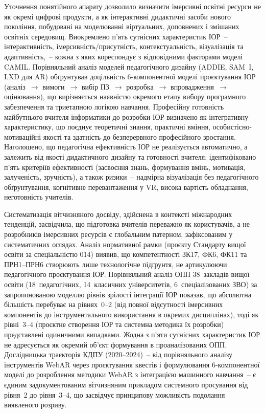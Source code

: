 Уточнення понятійного апарату дозволило визначити імерсивні освітні ресурси не як окремі цифрові продукти, а як інтерактивні дидактичні засоби нового покоління, побудовані на моделюванні віртуальних, доповнених і змішаних освітніх середовищ. Виокремлено п'ять сутнісних характеристик ІОР~-- інтерактивність, імерсивність/присутність, контекстуальність, візуалізація та адаптивність,~-- кожна з яких кореспондує з відповідними факторами моделі CAMIL. Порівняльний аналіз моделей педагогічного дизайну (ADDIE, SAM~I, LXD для AR) обґрунтував доцільність 6-компонентної моделі проєктування ІОР (аналіз~$\to$ вимоги~$\to$ вибір ПЗ~$\to$ розробка~$\to$ впровадження~$\to$ оцінювання), що вирізняється наявністю окремого етапу вибору програмного забезпечення та триетапною логікою навчання. Професійну готовність майбутнього вчителя інформатики до розробки ІОР визначено як інтегративну характеристику, що поєднує теоретичні знання, практичні вміння, особистісно-мотиваційні якості та здатність до безперервного професійного зростання. Наголошено, що педагогічна ефективність ІОР не реалізується автоматично, а залежить від якості дидактичного дизайну та готовності вчителя; ідентифіковано п'ять критеріїв ефективності (засвоєння знань, формування вмінь, мотивація, залученість, зручність), а також ризики~-- надмірна візуалізація без педагогічного обґрунтування, когнітивне перевантаження у VR, висока вартість обладнання, неготовність учителів.

Систематизація вітчизняного досвіду, здійснена в контексті міжнародних тенденцій, засвідчила, що підготовка вчителів переважно як користувачів, а не розробників імерсивних ресурсів є глобальним патерном, зафіксованим у систематичних оглядах. Аналіз нормативної рамки (проєкту Стандарту вищої освіти за спеціальністю 014) виявив, що компетентності ЗК17, ФК6, ФК11 та ПРН1--ПРН6 створюють лише технологічне підґрунтя, не артикулюючи педагогічного проєктування ІОР. Порівняльний аналіз ОПП 38~закладів вищої освіти (18~педагогічних, 14~класичних університетів, 6~спеціалізованих ЗВО) за запропонованою моделлю рівнів зрілості інтеграції ІОР показав, що абсолютна більшість перебуває на рівнях~0--2 (від повної відсутності імерсивних компонентів до інструментального використання в окремих дисциплінах), тоді як рівні~3--4 (проєктне створення ІОР та системна методика їх розробки) представлені одиничними випадками. Жодна з п'яти сутнісних характеристик ІОР не адресується як окремий об'єкт формування в проаналізованих ОПП. Дослідницька траєкторія КДПУ (2020--2024)~-- від порівняльного аналізу інструментів WebAR через проєктування квестів і формулювання 6-компонентної моделі до розроблення методики WebAR з інтеграцією машинного навчання~-- є єдиним задокументованим вітчизняним прикладом системного просування від рівня~2 до рівня~3--4, що засвідчує принципову можливість подолання виявленого розриву.

